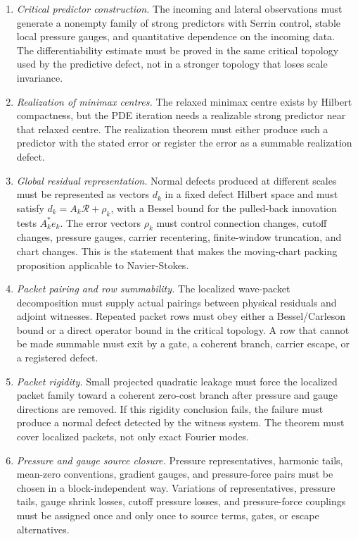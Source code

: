 \documentclass[11pt]{article}
\begin{document}
\begin{enumerate}[label=(\roman*)]
\item \emph{Critical predictor construction.}  The incoming and lateral
observations must generate a nonempty family of strong predictors with Serrin
control, stable local pressure gauges, and quantitative dependence on the
incoming data.  The differentiability estimate must be proved in the same
critical topology used by the predictive defect, not in a stronger topology that
loses scale invariance.

\item \emph{Realization of minimax centres.}  The relaxed minimax centre exists
by Hilbert compactness, but the PDE iteration needs a realizable strong predictor
near that relaxed centre.  The realization theorem must either produce such a
predictor with the stated error or register the error as a summable realization
defect.

\item \emph{Global residual representation.}  Normal defects produced at
different scales must be represented as vectors \(d_k\) in a fixed defect
Hilbert space and must satisfy \(d_k=A_k\mathcal R+\rho_k\), with a Bessel bound
for the pulled-back innovation tests \(A_k^*e_k\).  The error vectors \(\rho_k\)
must control connection changes, cutoff changes, pressure gauges, carrier
recentering, finite-window truncation, and chart changes.  This is the statement
that makes the moving-chart packing proposition applicable to Navier-Stokes.

\item \emph{Packet pairing and row summability.}  The localized wave-packet
decomposition must supply actual pairings between physical residuals and
adjoint witnesses.  Repeated packet rows must obey either a Bessel/Carleson bound
or a direct operator bound in the critical topology.  A row that cannot be made
summable must exit by a gate, a coherent branch, carrier escape, or a registered
defect.

\item \emph{Packet rigidity.}  Small projected quadratic leakage must force the
localized packet family toward a coherent zero-cost branch after pressure and
gauge directions are removed.  If this rigidity conclusion fails, the failure
must produce a normal defect detected by the witness system.  The theorem must
cover localized packets, not only exact Fourier modes.

\item \emph{Pressure and gauge source closure.}  Pressure representatives,
harmonic tails, mean-zero conventions, gradient gauges, and pressure-force pairs
must be chosen in a block-independent way.  Variations of representatives,
pressure tails, gauge shrink losses, cutoff pressure losses, and pressure-force
couplings must be assigned once and only once to source terms, gates, or escape
alternatives.


\end{enumerate}
\end{document}
